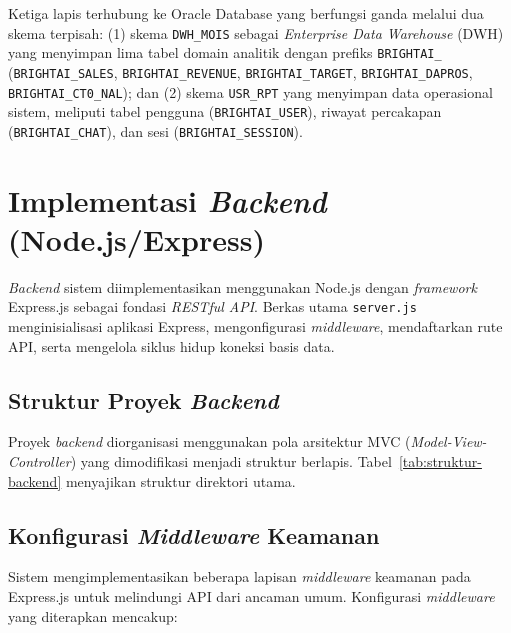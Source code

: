 {\sloppy Ketiga lapis terhubung ke Oracle Database yang berfungsi ganda melalui dua skema terpisah: (1) skema \texttt{DWH\_MOIS} sebagai \textit{Enterprise Data Warehouse} (DWH)\label{abbr:DWH} yang menyimpan lima tabel domain analitik dengan prefiks \texttt{BRIGHTAI\_} (\texttt{BRIGHTAI\_}\allowbreak\texttt{SALES}, \allowbreak\texttt{BRIGHTAI\_}\allowbreak\texttt{REVENUE}, \allowbreak\texttt{BRIGHTAI\_}\allowbreak\texttt{TARGET}, \allowbreak\texttt{BRIGHTAI\_}\allowbreak\texttt{DAPROS}, \allowbreak\texttt{BRIGHTAI\_}\allowbreak\texttt{CT0\_}\allowbreak\texttt{NAL}); dan (2) skema \texttt{USR\_RPT} yang menyimpan data operasional sistem, meliputi tabel pengguna (\texttt{BRIGHTAI\_}\allowbreak\texttt{USER}), riwayat percakapan (\texttt{BRIGHTAI\_}\allowbreak\texttt{CHAT}), dan sesi (\texttt{BRIGHTAI\_}\allowbreak\texttt{SESSION}).\par}

\section{Implementasi \textit{Backend} (Node.js/Express)}
\label{sec:impl-backend}

\textit{Backend} sistem diimplementasikan menggunakan Node.js dengan \textit{framework} Express.js sebagai fondasi \textit{RESTful API}. Berkas utama \texttt{server.js} menginisialisasi aplikasi Express, mengonfigurasi \textit{middleware}, mendaftarkan rute API, serta mengelola siklus hidup koneksi basis data.

\subsection{Struktur Proyek \textit{Backend}}

Proyek \textit{backend} diorganisasi menggunakan pola arsitektur MVC (\textit{Model-View- Controller}) yang dimodifikasi menjadi struktur berlapis. Tabel~\ref{tab:struktur-backend} menyajikan struktur direktori utama.



\subsection{Konfigurasi \textit{Middleware} Keamanan}

Sistem mengimplementasikan beberapa lapisan \textit{middleware} keamanan pada Express.js untuk melindungi API dari ancaman umum. Konfigurasi \textit{middleware} yang diterapkan mencakup:

